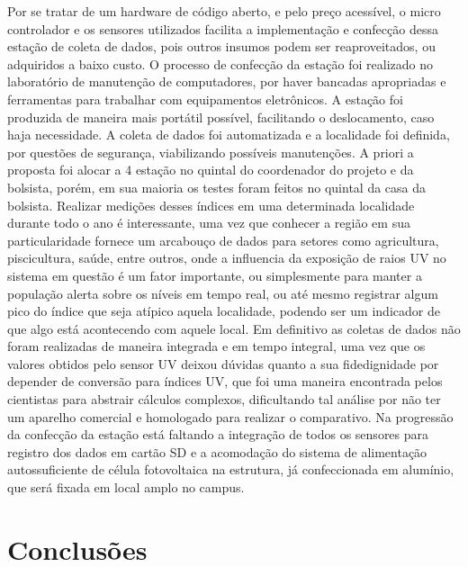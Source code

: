 \documentclass[article,12pt,onesidea,4paper,english,brazil]{abntex2}
\begin{document}
	Por se tratar de um hardware de código aberto, e pelo preço acessível, o micro controlador e os sensores utilizados facilita a implementação e confecção dessa estação de coleta de dados, pois outros insumos podem ser reaproveitados, ou adquiridos a baixo custo. O processo de confecção da estação foi realizado no laboratório de manutenção de computadores, por haver bancadas apropriadas e ferramentas para trabalhar com equipamentos eletrônicos. A estação foi produzida de maneira mais portátil possível, facilitando o deslocamento, caso haja necessidade.
	A coleta de dados foi automatizada e a localidade foi definida, por questões de segurança, viabilizando possíveis manutenções. A priori a proposta foi alocar a
	4
	estação no quintal do coordenador do projeto e da bolsista, porém, em sua maioria os testes foram feitos no quintal da casa da bolsista.
	Realizar medições desses índices em uma determinada localidade durante todo o ano é interessante, uma vez que conhecer a região em sua particularidade fornece um arcabouço de dados para setores como agricultura, piscicultura, saúde, entre outros, onde a influencia da exposição de raios UV no sistema em questão é um fator importante, ou simplesmente para manter a população alerta sobre os níveis em tempo real, ou até mesmo registrar algum pico do índice que seja atípico aquela localidade, podendo ser um indicador de que algo está acontecendo com aquele local.
	Em definitivo as coletas de dados não foram realizadas de maneira integrada e em tempo integral, uma vez que os valores obtidos pelo sensor UV deixou dúvidas quanto a sua fidedignidade por depender de conversão para índices UV, que foi uma maneira encontrada pelos cientistas para abstrair cálculos complexos, dificultando tal análise por não ter um aparelho comercial e homologado para realizar o comparativo. Na progressão da confecção da estação está faltando a integração de todos os sensores para registro dos dados em cartão SD e a acomodação do sistema de alimentação autossuficiente de célula fotovoltaica na estrutura, já confeccionada em alumínio, que será fixada em local amplo no campus.
	
	\section*{Conclusões}
	
\end{document}

